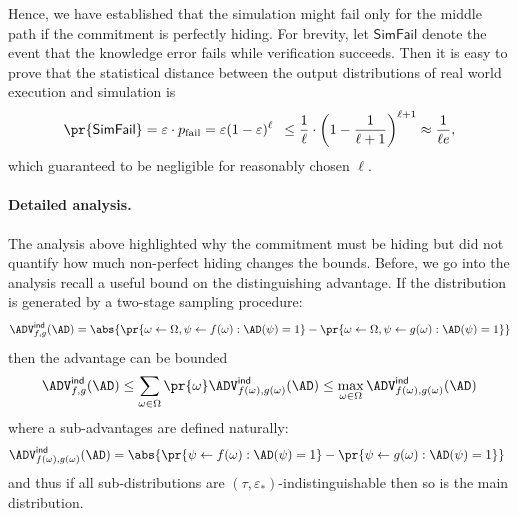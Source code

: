\documentclass{crypto-exercise}
\renewcommand{\ADVIND}[2]{\ADV^{\mathsf{ind}}_{#1}(#2)}
\newcommand{\PFAIL}{p_{\mathrm{fail}}}
\newcommand{\SFAIL}{\mathsf{SimFail}}
\begin{document}
\begin{solution}
Hence, we have established that the simulation might fail only for the middle path if the commitment is perfectly hiding. For brevity, let $\SFAIL$ denote the event that the knowledge error fails while verification succeeds. Then it is easy to prove that the statistical distance between the output distributions of real world execution and simulation is
\begin{align*}
\pr{\SFAIL}=\varepsilon\cdot \PFAIL = \varepsilon(1-\varepsilon)^\ell\enspace\leq \frac{1}{\ell}\cdot\left(1-\frac{1}{\ell+1}\right)^{\ell+1}\approx \frac{1}{\ell e},
\end{align*} 
which guaranteed to be negligible for reasonably chosen $\ell$.

\paragraph{Detailed analysis.}
The analysis above highlighted why the commitment must be hiding but did not quantify how much non-perfect hiding changes the bounds. Before, we go into the analysis recall a useful  bound on the distinguishing advantage. If the distribution is generated by a two-stage sampling procedure:
\begin{align*}
\ADVIND{f,g}{\AD}=\abs{\pr{\omega\gets\Omega, \psi\gets f(\omega): \AD(\psi)=1}- \pr{\omega\gets\Omega, \psi\gets g(\omega): \AD(\psi)=1 }}
\end{align*} 
then the advantage can be bounded  
\begin{align*}
\ADVIND{f,g}{\AD}\leq \sum_{\omega\in\Omega}\pr{\omega}\ADVIND{f(\omega),g(\omega)}{\AD}
\leq \max_{\omega\in\Omega} \ADVIND{f(\omega),g(\omega)}{\AD}
\end{align*} 
where a sub-advantages are defined naturally:
\begin{align*}
\ADVIND{f(\omega),g(\omega)}{\AD}=\abs{\pr{\psi\gets f(\omega): \AD(\psi)=1}- \pr{\psi\gets g(\omega): \AD(\psi)=1 }}\enspace
\end{align*}
and thus if all sub-distributions are $(\tau,\varepsilon_*)$-indistinguishable then so is the main distribution.  


\end{solution}
\end{document}
